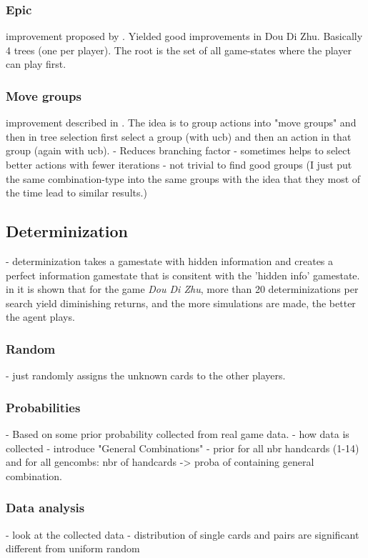 \subsubsection{Epic}
improvement proposed by \cite{whitehouse14}. Yielded good improvements in Dou Di Zhu.
Basically 4 trees (one per player). The root is the set of all game-states where the player can play first.


\subsubsection{Move groups}
improvement described in \cite{movegroups}. The idea is to group actions into "move groups" and then in tree selection first select a group (with ucb) and then an action in that group (again with ucb).
- Reduces branching factor
- sometimes helps to select better actions with fewer iterations
- not trivial to find good groups (I just put the same combination-type into the same groups with the idea that they most of the time lead to similar results.) %


\subsection{Determinization}
\label{sec:determinization}
- determinization takes a gamestate with hidden information and creates a perfect information gamestate that is consitent with the 'hidden info' gamestate.
in \cite[p.~54+]{whitehouse14} it is shown that for the game \textit{Dou Di Zhu}, more than 20 determinizations per search yield diminishing returns, and the more simulations are made, the better the agent plays.

\subsubsection{Random}
- just randomly assigns the unknown cards to the other players.


\subsubsection{Probabilities}
- Based on some prior probability collected from real game data. - how data is collected
- introduce "General Combinations"
- prior for all nbr handcards (1-14) and for all gencombs: nbr of handcards -> proba of containing general combination.


\subsubsection{Data analysis}
- look at the collected data
- distribution of single cards and pairs are significant different from uniform random


